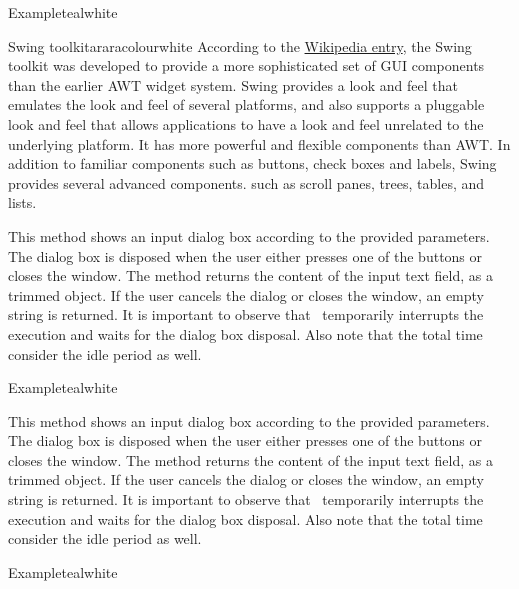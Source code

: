 \begin{description}
\begin{codebox}{Example}{teal}{\icnote}{white}
\end{codebox}

\begin{messagebox}{Swing toolkit}{araracolour}{\icok}{white}
According to the \href{https://en.wikipedia.org/wiki/Swing_(Java)}{Wikipedia entry}, the Swing toolkit was developed to provide a more sophisticated set of GUI components than the earlier  AWT widget system. Swing provides a look and feel that emulates the look and feel of several platforms, and also supports a pluggable look and feel that allows applications to have a look and feel unrelated to the underlying platform. It has more powerful and flexible components than AWT. In addition to familiar components such as buttons, check boxes and labels, Swing provides several advanced components. such as scroll panes, trees, tables, and lists.
\end{messagebox}

\item[\mdbox{R}{showInput(int width, int icon, String title, String text)}{String}]

This method shows an input dialog box according to the provided parameters. The dialog box is disposed when the user either presses one of the buttons or closes the window. The method returns the content of the input text field, as a trimmed  object. If the user cancels the dialog or closes the window, an empty string is returned. It is important to observe that \arara\ temporarily interrupts the execution and waits for the dialog box disposal. Also note that the total time consider the idle period as well.

\begin{codebox}{Example}{teal}{\icnote}{white}
\end{codebox}

\item[\mdbox{R}{showInput(int icon, String title, String text)}{String}]

This method shows an input dialog box according to the provided parameters. The dialog box is disposed when the user either presses one of the buttons or closes the window. The method returns the content of the input text field, as a trimmed  object. If the user cancels the dialog or closes the window, an empty string is returned. It is important to observe that \arara\ temporarily interrupts the execution and waits for the dialog box disposal. Also note that the total time consider the idle period as well.

\begin{codebox}{Example}{teal}{\icnote}{white}
\end{codebox}
\end{description}

